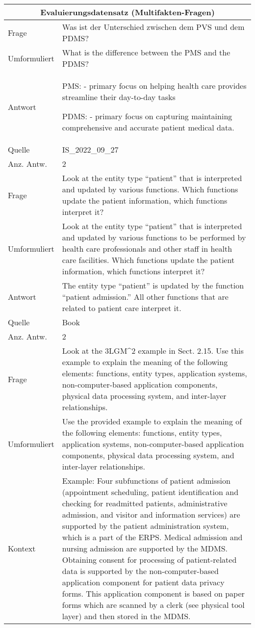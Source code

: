 \begin{landscape}
    \begin{longtable}{p{3cm}p{}}
    \toprule
    \multicolumn{2}{c}{\textbf{Evaluierungsdatensatz (Multifakten-Fragen)}}\\
    \midrule
    Frage & Was ist der Unterschied zwischen dem PVS und dem PDMS? \\
    Umformuliert & What is the difference between the PMS and the PDMS? \\
    Antwort & PMS:
    - primary focus on helping health care provides streamline their day-to-day tasks

    PDMS:
    - primary focus on capturing maintaining comprehensive and accurate patient medical data.\\
    Quelle & IS\_2022\_09\_27 \\
    Anz. Antw. & 2 \\
    \midrule
    Frage & Look at the entity type ``patient'' that is interpreted and updated by various functions.
    Which functions update the patient information, which functions interpret it? \\
    Umformuliert & Look at the entity type ``patient'' that is interpreted and updated by various functions to be performed by health care professionals and other staff in health care facilities.
    Which functions update the patient information, which functions interpret it? \\
    Antwort & The entity type ``patient'' is updated by the function ``patient admission.'' All other functions that are related to patient care interpret it.\\
    Quelle & Book \\
    Anz. Antw. & 2 \\
    \midrule
    Frage & Look at the 3LGM\textasciicircum{}2 example in Sect. 2.15.
    Use this example to explain the meaning of the following elements: functions, entity types, application systems, non-computer-based application components, physical data processing system, and inter-layer relationships.\\
    Umformuliert & Use the provided example to explain the meaning of the following elements: functions, entity types, application systems, non-computer-based application components, physical data processing system, and inter-layer relationships.\\
    Kontext & Example: Four subfunctions of patient admission (appointment scheduling, patient identification and checking for readmitted patients, administrative admission, and visitor and information services) are supported by the patient administration system, which is a part of the ERPS.
    Medical admission and nursing admission are supported by the MDMS.
    Obtaining consent for processing of patient-related data is supported by the non-computer-based application component for patient data privacy forms.
    This application component is based on paper forms which are scanned by a clerk (see physical tool layer) and then stored in the MDMS.


\end{longtable}
\end{landscape}
